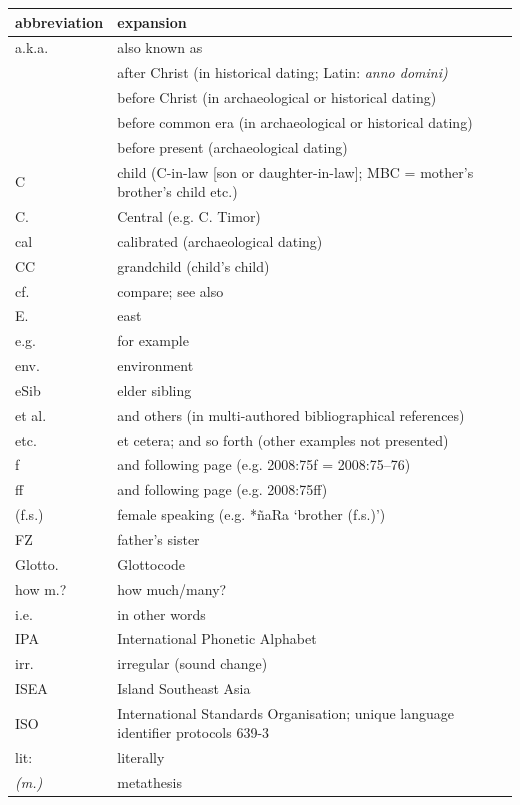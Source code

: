 {\wg
\begin{xltabular}{\textwidth}[l]{l>{\raggedright\arraybackslash}X}
\lsptoprule			
{abbreviation}	&	{expansion}	\\	\midrule
\endhead
a.k.a.	&	also known as	\\
	&	after Christ (in historical dating; Latin: \it{anno domini})	\\
	&	before Christ (in archaeological or historical dating)	\\
	&	before common era (in archaeological or historical dating)	\\
	&	before present (archaeological dating)	\\
C	&	child (C-in-law [son or daughter-in-law]; MBC = mother’s brother’s child etc.)	\\
C.	&	Central (e.g. C. Timor)	\\
cal	&	calibrated (archaeological dating)	\\
CC	&	grandchild (child's child)	\\
cf.	&	compare; see also	\\
E.	&	east	\\
e.g.	&	for example	\\
env.	&	environment	\\
eSib	&	elder sibling	\\
et al.	&	and others (in multi-authored bibliographical references)	\\
etc.	&	et cetera; and so forth (other examples not presented)	\\
f & and following page (e.g. 2008:75f = 2008:75–76) \\
ff & and following page (e.g. 2008:75ff) \\
(f.s.)	&	female speaking (e.g. *ñaRa ‘brother (f.s.)’)	\\
FZ	&	father's sister	\\
Glotto.	&	Glottocode \citep{Hammarstrom2023}	\\
how m.?	&	how much/many?	\\
i.e.	&	in other words	\\
IPA	&	International Phonetic Alphabet	\\
irr.	&	irregular (sound change)	\\
ISEA	&	Island Southeast Asia	\\
ISO	&	International Standards Organisation; unique language identifier protocols 639-3 	\\
lit:	&	literally	\\
\it{(m.)}	&	metathesis	\\

\end{xltabular}}
